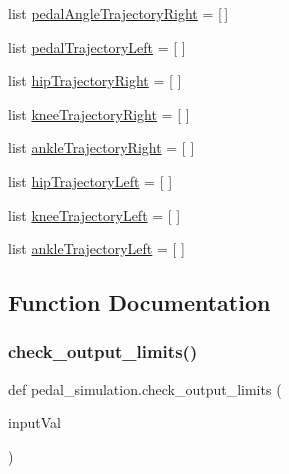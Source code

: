 \begin{DoxyCompactItemize}
\item 
list \mbox{\hyperlink{namespacepedal__simulation_a72c8de21c0e38ec59eadc8cb8687ab98}{pedal\+Angle\+Trajectory\+Right}} = \mbox{[}$\,$\mbox{]}
\item 
list \mbox{\hyperlink{namespacepedal__simulation_a12e73e8d9659f2c2cc7a34402adc9698}{pedal\+Trajectory\+Left}} = \mbox{[} \mbox{]}
\item 
list \mbox{\hyperlink{namespacepedal__simulation_a8203cc4243bfe20af84c0116c8cda802}{hip\+Trajectory\+Right}} = \mbox{[} \mbox{]}
\item 
list \mbox{\hyperlink{namespacepedal__simulation_a917db9bbb8bc8e0577bf0a84ab41f58a}{knee\+Trajectory\+Right}} = \mbox{[} \mbox{]}
\item 
list \mbox{\hyperlink{namespacepedal__simulation_a1ad9055051bf67d8eb766574be88d5f9}{ankle\+Trajectory\+Right}} = \mbox{[} \mbox{]}
\item 
list \mbox{\hyperlink{namespacepedal__simulation_abe8e07684ed66f9eb97c465a534b3100}{hip\+Trajectory\+Left}} = \mbox{[} \mbox{]}
\item 
list \mbox{\hyperlink{namespacepedal__simulation_a70a2d946d5cdbbc879ebdfa02ae32ba7}{knee\+Trajectory\+Left}} = \mbox{[} \mbox{]}
\item 
list \mbox{\hyperlink{namespacepedal__simulation_a3f5a09536c7fd1d22868f6b4f0d4b463}{ankle\+Trajectory\+Left}} = \mbox{[} \mbox{]}
\end{DoxyCompactItemize}


\subsection{Function Documentation}
\mbox{\label{namespacepedal__simulation_a9a988ba4805ee8b66861de311be2f06d}} 
\subsubsection{\texorpdfstring{check\_output\_limits()}{check\_output\_limits()}}
{\footnotesize\ttfamily def pedal\+\_\+simulation.\+check\+\_\+output\+\_\+limits (\begin{DoxyParamCaption}\item[{}]{input\+Val }\end{DoxyParamCaption})}



